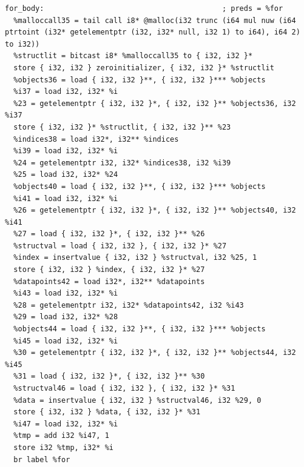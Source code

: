 \documentclass[12pt]{article}
\begin{document}
\begin{mdframed}[hidealllines=true,backgroundcolor=green!10]
\begin{lstlisting}
for_body:                                         ; preds = %for
  %malloccall35 = tail call i8* @malloc(i32 trunc (i64 mul nuw (i64 ptrtoint (i32* getelementptr (i32, i32* null, i32 1) to i64), i64 2) to i32))
  %structlit = bitcast i8* %malloccall35 to { i32, i32 }*
  store { i32, i32 } zeroinitializer, { i32, i32 }* %structlit
  %objects36 = load { i32, i32 }**, { i32, i32 }*** %objects
  %i37 = load i32, i32* %i
  %23 = getelementptr { i32, i32 }*, { i32, i32 }** %objects36, i32 %i37
  store { i32, i32 }* %structlit, { i32, i32 }** %23
  %indices38 = load i32*, i32** %indices
  %i39 = load i32, i32* %i
  %24 = getelementptr i32, i32* %indices38, i32 %i39
  %25 = load i32, i32* %24
  %objects40 = load { i32, i32 }**, { i32, i32 }*** %objects
  %i41 = load i32, i32* %i
  %26 = getelementptr { i32, i32 }*, { i32, i32 }** %objects40, i32 %i41
  %27 = load { i32, i32 }*, { i32, i32 }** %26
  %structval = load { i32, i32 }, { i32, i32 }* %27
  %index = insertvalue { i32, i32 } %structval, i32 %25, 1
  store { i32, i32 } %index, { i32, i32 }* %27
  %datapoints42 = load i32*, i32** %datapoints
  %i43 = load i32, i32* %i
  %28 = getelementptr i32, i32* %datapoints42, i32 %i43
  %29 = load i32, i32* %28
  %objects44 = load { i32, i32 }**, { i32, i32 }*** %objects
  %i45 = load i32, i32* %i
  %30 = getelementptr { i32, i32 }*, { i32, i32 }** %objects44, i32 %i45
  %31 = load { i32, i32 }*, { i32, i32 }** %30
  %structval46 = load { i32, i32 }, { i32, i32 }* %31
  %data = insertvalue { i32, i32 } %structval46, i32 %29, 0
  store { i32, i32 } %data, { i32, i32 }* %31
  %i47 = load i32, i32* %i
  %tmp = add i32 %i47, 1
  store i32 %tmp, i32* %i
  br label %for


\end{lstlisting}
\end{mdframed}
\end{document}
